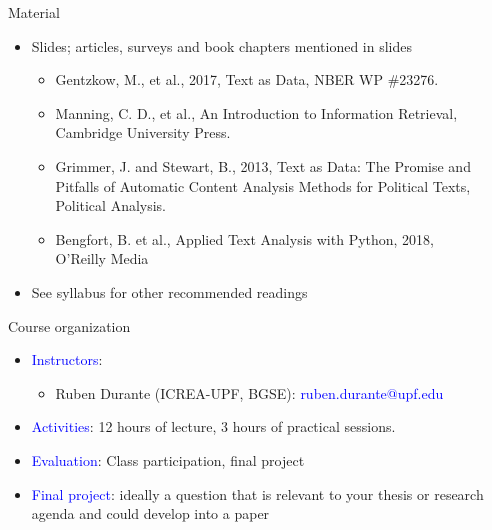 \documentclass[english]{beamer}
\begin{document}
\begin{frame}{Material}

\begin{itemize}
\setlength{\itemsep}{0.7em}
    \item  Slides; articles, surveys and book chapters mentioned in slides
    \vspace{4pt}
\begin{itemize}
\setlength{\itemsep}{0.7em}
\setlength{\itemindent}{-0.8em}
    \item  Gentzkow, M., et al., 2017, Text as Data, NBER WP \#23276.
    \item  Manning, C. D., et al., An Introduction to Information Retrieval,\\
\hspace{-8pt}Cambridge University Press.
    \item Grimmer, J. and Stewart, B., 2013, Text as Data: The Promise and\\
\hspace{-8pt}Pitfalls of Automatic Content Analysis Methods for Political Texts,\\
\hspace{-8pt}Political Analysis.
\item Bengfort, B. et al., Applied Text Analysis with Python, 2018,\\
\hspace{-8pt}O'Reilly Media
\end{itemize}
\item See syllabus for other recommended readings
\end{itemize}
\end{frame}

\begin{frame}{Course organization}
\begin{itemize}
\setlength{\itemsep}{1em}
    \item  \textcolor{blue}{Instructors}: 
    \vspace{4pt}
    \begin{itemize}
    \setlength{\itemsep}{0.6em}
    \item Ruben Durante (ICREA-UPF, BGSE): \textcolor{blue}{ruben.durante@upf.edu}
    \end{itemize}
    \item \textcolor{blue}{Activities}: 12 hours of lecture, 3 hours of practical sessions.
    \item  \textcolor{blue}{Evaluation}: Class participation, final project
   \item  \textcolor{blue}{Final project}: ideally a question that is relevant to your thesis or research agenda and could develop into a paper
\end{itemize}
\end{frame}
\end{document}
